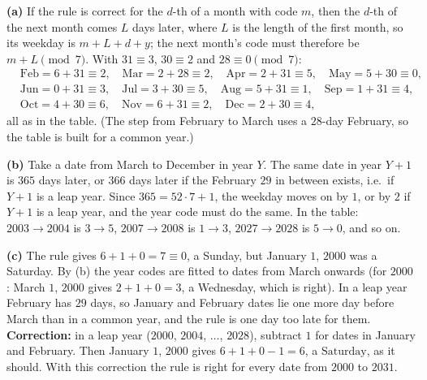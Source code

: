 \textbf{(a)} If the rule is correct for the $d$-th of a month with code $m$, then the $d$-th of the next month comes $L$ days later, where $L$ is the length of the first month, so its weekday is $m+L+d+y$; the next month's code must therefore be $m+L\pmod7$. With $31\equiv3$, $30\equiv2$ and $28\equiv0\pmod7$:
\[
\begin{aligned}
&\text{Feb}=6+31\equiv2,\quad \text{Mar}=2+28\equiv2,\quad \text{Apr}=2+31\equiv5,\quad \text{May}=5+30\equiv0,\\
&\text{Jun}=0+31\equiv3,\quad \text{Jul}=3+30\equiv5,\quad \text{Aug}=5+31\equiv1,\quad \text{Sep}=1+31\equiv4,\\
&\text{Oct}=4+30\equiv6,\quad \text{Nov}=6+31\equiv2,\quad \text{Dec}=2+30\equiv4,
\end{aligned}
\]
all as in the table. (The step from February to March uses a $28$-day February, so the table is built for a common year.)

\textbf{(b)} Take a date from March to December in year $Y$. The same date in year $Y+1$ is $365$ days later, or $366$ days later if the February $29$ in between exists, i.e.\ if $Y+1$ is a leap year. Since $365=52\cdot7+1$, the weekday moves on by $1$, or by $2$ if $Y+1$ is a leap year, and the year code must do the same. In the table: $2003\to2004$ is $3\to5$, $2007\to2008$ is $1\to3$, $2027\to2028$ is $5\to0$, and so on.

\textbf{(c)} The rule gives $6+1+0=7\equiv0$, a Sunday, but January $1$, $2000$ was a Saturday. By (b) the year codes are fitted to dates from March onwards (for $2000$: March $1$, $2000$ gives $2+1+0=3$, a Wednesday, which is right). In a leap year February has $29$ days, so January and February dates lie one more day before March than in a common year, and the rule is one day too late for them. \textbf{Correction:} in a leap year ($2000$, $2004$, $\dots$, $2028$), subtract $1$ for dates in January and February. Then January $1$, $2000$ gives $6+1+0-1=6$, a $\boxed{\text{Saturday}}$, as it should. With this correction the rule is right for every date from $2000$ to $2031$.
